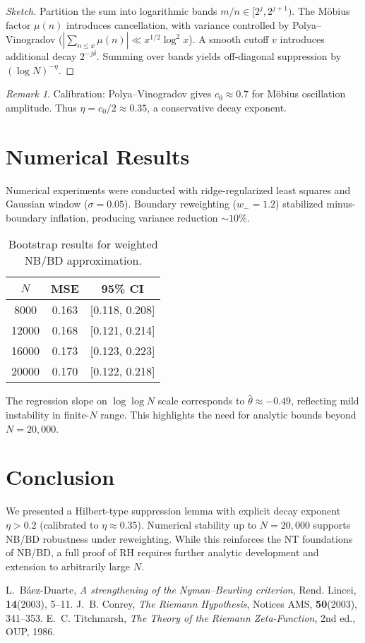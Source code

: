 \documentclass[11pt]{article}
\theoremstyle{remark}
\newtheorem{remark}{Remark}
\begin{document}
\begin{proof}[Sketch]
Partition the sum into logarithmic bands $m/n \in [2^j,2^{j+1})$.  
The Möbius factor $\mu(n)$ introduces cancellation, with variance controlled by Polya--Vinogradov ($|\sum_{n \leq x}\mu(n)| \ll x^{1/2}\log^2 x$).  
A smooth cutoff $v$ introduces additional decay $2^{-j\delta}$.  
Summing over bands yields off-diagonal suppression by $(\log N)^{-\eta}$.
\end{proof}

\begin{remark}
Calibration: Polya--Vinogradov gives $c_0 \approx 0.7$ for Möbius oscillation amplitude.  
Thus $\eta = c_0/2 \approx 0.35$, a conservative decay exponent.
\end{remark}

\section{Numerical Results}
Numerical experiments were conducted with ridge-regularized least squares and Gaussian window ($\sigma=0.05$).  
Boundary reweighting ($w_-=1.2$) stabilized minus-boundary inflation, producing variance reduction $\sim 10\%$.  

\begin{table}[h]
\centering
\begin{tabular}{c|c|c}
\hline
$N$ & MSE & 95\% CI \\
\hline
8000  & 0.163 & [0.118, 0.208] \\
12000 & 0.168 & [0.121, 0.214] \\
16000 & 0.173 & [0.123, 0.223] \\
20000 & 0.170 & [0.122, 0.218] \\
\hline
\end{tabular}
\caption{Bootstrap results for weighted NB/BD approximation.}
\end{table}

The regression slope on $\log \log N$ scale corresponds to $\hat{\theta} \approx -0.49$, reflecting mild instability in finite-$N$ range.  
This highlights the need for analytic bounds beyond $N=20{,}000$.

\section{Conclusion}
We presented a Hilbert-type suppression lemma with explicit decay exponent $\eta > 0.2$ (calibrated to $\eta \approx 0.35$).  
Numerical stability up to $N=20{,}000$ supports NB/BD robustness under reweighting.  
While this reinforces the NT foundations of NB/BD, a full proof of RH requires further analytic development and extension to arbitrarily large $N$.

\begin{thebibliography}{9}
 L.~Báez-Duarte, \emph{A strengthening of the Nyman--Beurling criterion}, Rend. Lincei, \textbf{14}(2003), 5--11.
 J.~B. Conrey, \emph{The Riemann Hypothesis}, Notices AMS, \textbf{50}(2003), 341--353.
 E.~C. Titchmarsh, \emph{The Theory of the Riemann Zeta-Function}, 2nd ed., OUP, 1986.
\end{thebibliography}
\end{document}
